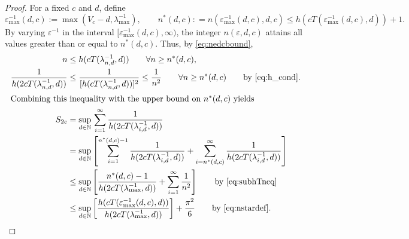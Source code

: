 \documentclass[11pt,a4paper]{article}
\begin{document}
\begin{proof}
For a fixed $c$ and $d$, define
\begin{equation} \label{eq:nstardef}
	\varepsilon^{-1}_{\max}(d,c) := \max(V_c - d,\lambda_{\max}^{-1}), \qquad n^*(d,c) : = n(\varepsilon^{-1}_{\max}(d,c),d,c) \le h(cT(\varepsilon^{-1}_{\max}(d,c),d)) +1.
\end{equation}
By varying $\varepsilon^{-1}$ in the interval $[\varepsilon^{-1}_{\max}(d,c),\infty)$,  the integer $n(\varepsilon,d,c)$ attains all values greater than or equal to $n^*(d,c)$.  Thus, by \eqref{eq:nedcbound},
\begin{align}
		n &\le h(cT(\lambda^{-1}_{n,d},d)) \qquad  \forall n \ge n^*(d,c), \label{eq:subhTneq}\\
		\nonumber
		\frac{1}{h(2 cT(\lambda^{-1}_{n,d},d)) } & \le \frac{1}{[h(cT(\lambda^{-1}_{n,d},d))]^{2}}  \le \frac 1{n^2}   \qquad  \forall n \ge n^*(d,c) \qquad \text{by \eqref{eq:h_cond}}. \\
		\intertext{Combining this inequality with the upper bound on $n^*(d,c)$ yields}
		\nonumber
		S_{2c} & =\sup_{d\in\mathbb{N}}  \, \sum_{i=1}^\infty \frac1{h(2cT(\lambda_{i,d}^{-1},d))} \\
		\nonumber
		&  = \sup_{d\in\mathbb{N}} \left [
		\sum_{i=1}^{n^*(d,c)-1} \frac1{h(2cT(\lambda_{i,d}^{-1},d))}
		+ \sum_{i=n^*(d,c)}^\infty \frac1{h(2cT(\lambda_{i,d}^{-1},d))}
		\right]\\
		 \nonumber
		 & \le \sup_{d\in\mathbb{N}} \left [
\frac{n^*(d,c)-1}{h(2cT(\lambda_{\max}^{-1},d))}
+ \sum_{i=1}^\infty \frac1{n^2}
\right]
 \qquad \text{by \eqref{eq:subhTneq}}\\
 \label{eq:lastone}
		 & \le \sup_{d\in\mathbb{N}} \left [
		 \frac{ h(cT(\varepsilon^{-1}_{\max}(d,c),d))}{h(2cT(\lambda_{\max}^{-1},d))}
		\right] + \frac{\pi^2}{6}
		\qquad \text{by \eqref{eq:nstardef}.}
\end{align}


\end{proof}
\end{document}

